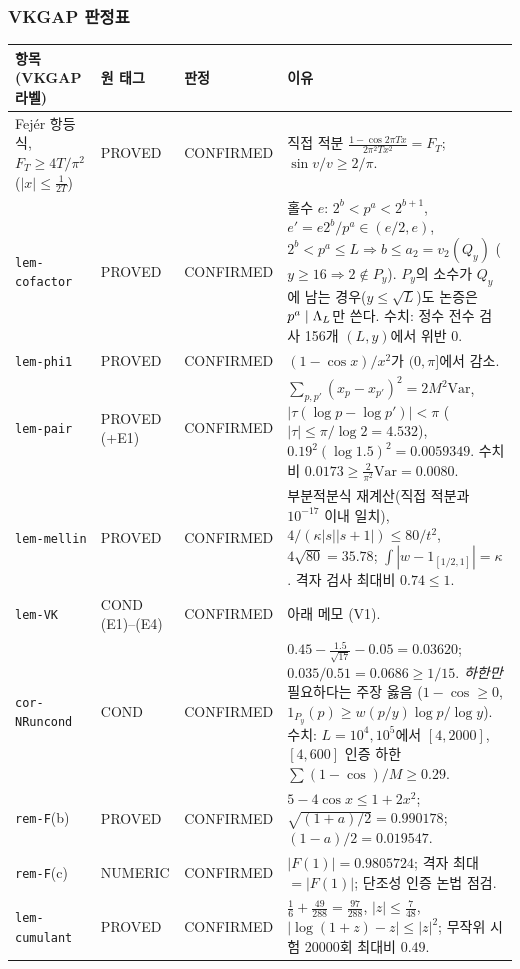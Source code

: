 \subsubsection{VKGAP 판정표}\label{AUD3:ssec-vk-table}
\begin{center}\small
\begin{longtable}{p{}p{}p{}p{}}
\toprule
항목 (VKGAP 라벨) & 원 태그 & 판정 & 이유\\\midrule
\endhead
Fejér 항등식, $F_T\ge4T/\pi^2$ ($|x|\le\frac1{2T}$) & PROVED & CONFIRMED & 직접 적분 $\frac{1-\cos2\pi Tx}{2\pi^2Tx^2}=F_T$; $\sin v/v\ge2/\pi$.\\
\texttt{lem-cofactor} & PROVED & CONFIRMED & 홀수 $e$: $2^b<p^a<2^{b+1}$, $e'=e2^b/p^a\in(e/2,e)$, $2^b<p^a\le L\Rightarrow b\le a_2=v_2(Q_y)$ ($y\ge16\Rightarrow2\notin P_y$). $P_y$의 소수가 $Q_y$에 남는 경우($y\le\sqrt L$)도 논증은 $p^a\mid\Lambda_L$만 쓴다. 수치: 정수 전수 검사 156개 $(L,y)$에서 위반 0.\\
\texttt{lem-phi1} & PROVED & CONFIRMED & $(1-\cos x)/x^2$가 $(0,\pi]$에서 감소.\\
\texttt{lem-pair} & PROVED (+E1) & CONFIRMED & $\sum_{p,p'}(x_p-x_{p'})^2=2M^2\mathrm{Var}$, $|\tau(\log p-\log p')|<\pi$ ($|\tau|\le\pi/\log2=4.532$), $0.19^2(\log1.5)^2=0.0059349$. 수치 비 $0.0173\ge\frac2{\pi^2}\mathrm{Var}=0.0080$.\\
\texttt{lem-mellin} & PROVED & CONFIRMED & 부분적분식 재계산(직접 적분과 $10^{-17}$ 이내 일치), $4/(\kappa|s||s+1|)\le80/t^2$, $4\sqrt{80}=35.78$; $\int|w-1_{[1/2,1]}|=\kappa$. 격자 검사 최대비 $0.74\le1$.\\
\texttt{lem-VK} & COND (E1)--(E4) & CONFIRMED & 아래 메모 (V1).\\
\texttt{cor-NRuncond} & COND & CONFIRMED & $0.45-\frac{1.5}{\sqrt{17}}-0.05=0.03620$; $0.035/0.51=0.0686\ge1/15$. \emph{하한만} 필요하다는 주장 옳음 ($1-\cos\ge0$, $1_{P_y}(p)\ge w(p/y)\log p/\log y$). 수치: $L=10^4,10^5$에서 $[4,2000]$, $[4,600]$ 인증 하한 $\sum(1-\cos)/M\ge0.29$.\\
\texttt{rem-F}(b) & PROVED & CONFIRMED & $5-4\cos x\le1+2x^2$; $\sqrt{(1+a)/2}=0.990178$; $(1-a)/2=0.019547$.\\
\texttt{rem-F}(c) & NUMERIC & CONFIRMED & $|F(1)|=0.9805724$; 격자 최대 $=|F(1)|$; 단조성 인증 논법 점검.\\
\texttt{lem-cumulant} & PROVED & CONFIRMED & $\frac16+\frac{49}{288}=\frac{97}{288}$, $|z|\le\frac7{48}$, $|\log(1+z)-z|\le|z|^2$; 무작위 시험 20000회 최대비 $0.49$.\\

\end{longtable}
\end{center}
